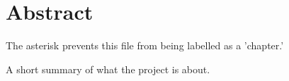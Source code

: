 
\chapter*{Abstract}
 The asterisk prevents this file from being labelled
 as a 'chapter.'

A short summary of what the project is about.